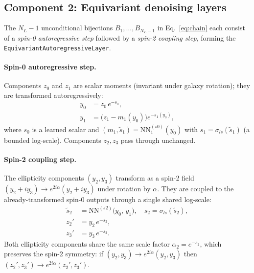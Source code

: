 \subsection*{Component 2: Equivariant denoising layers}

The $N_L-1$ unconditional bijections $B_1,\ldots,B_{N_L-1}$ in
Eq.~\eqref{eq:chain} each consist of a \emph{spin-0 autoregressive step}
followed by a \emph{spin-2 coupling step}, forming the
\texttt{EquivariantAutoregressiveLayer}.

\paragraph{Spin-0 autoregressive step.}
Components $z_0$ and $z_1$ are scalar moments (invariant under galaxy
rotation); they are transformed autoregressively:
\begin{align}
  y_0 &= z_0\,e^{-s_0}, \label{eq:spin0_0}\\
  y_1 &= \bigl(z_1 - m_1(y_0)\bigr)e^{-s_1(y_0)}, \label{eq:spin0_1}
\end{align}
where $s_0$ is a learned scalar and $(m_1,\tilde{s}_1)=\mathrm{NN}^{(s0)}_1(y_0)$
with $s_1=\sigma_{ls}(\tilde{s}_1)$ (a bounded log-scale).
Components $z_2,z_3$ pass through unchanged.

\paragraph{Spin-2 coupling step.}
The ellipticity components $(y_2,y_3)$ transform as a spin-2 field
$(y_2+iy_3)\to e^{2i\alpha}(y_2+iy_3)$ under rotation by $\alpha$.
They are coupled to the already-transformed spin-0 outputs through a
single shared log-scale:
\begin{align}
  \tilde{s}_2
    &= \mathrm{NN}^{(s2)}\!\bigl(y_0,\,y_1\bigr),
    \quad s_2=\sigma_{ls}(\tilde{s}_2),
    \label{eq:spin2_coeff}\\
  z_2' &= y_2\,e^{-s_2}, \label{eq:spin2_2}\\
  z_3' &= y_3\,e^{-s_2}. \label{eq:spin2_3}
\end{align}
Both ellipticity components share the same scale factor
$\alpha_2=e^{-s_2}$, which preserves the spin-2 symmetry: if
$(y_2,y_3)\to e^{2i\alpha}(y_2,y_3)$ then $(z_2',z_3')\to
e^{2i\alpha}(z_2',z_3')$.

